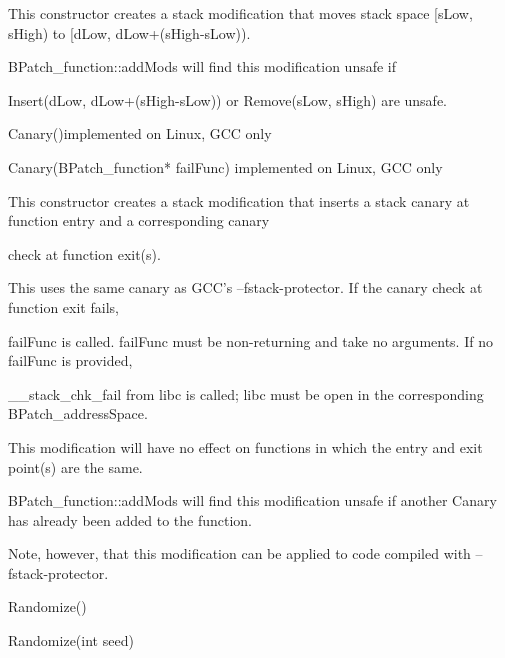 {{

This constructor creates a stack modification that moves stack space [sLow, sHigh) to [dLow, dLow+(sHigh-sLow)).}



{

BPatch_function::addMods will find this modification unsafe if \newline

Insert(dLow, dLow+(sHigh-sLow)) or Remove(sLow, sHigh) are unsafe.}



{

Canary()implemented on Linux, GCC only}



{

Canary(BPatch_function* failFunc) implemented on Linux, GCC only}



{

This constructor creates a stack modification that inserts a stack canary at function entry and a corresponding canary

check at function exit(s).



{

This uses the same canary as GCC's –fstack-protector. If the canary check at function exit fails,

failFunc is called. failFunc must be non-returning and take no arguments. If no failFunc is provided,

__stack_chk_fail from libc is called; libc must be open in the corresponding BPatch_addressSpace.}



{

This modification will have no effect on functions in which the entry and exit point(s) are the same.}



{

BPatch_function::addMods will find this modification unsafe if another Canary has already been added to the function.

Note, however, that this modification can be applied to code compiled with –fstack-protector.}



{

Randomize()}



{

Randomize(int seed)}



}}
